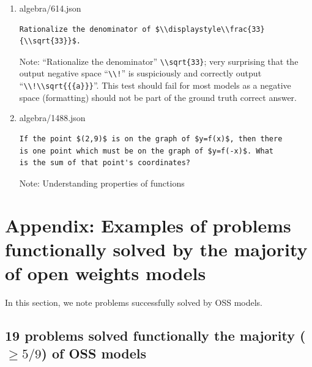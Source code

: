 \documentclass[11pt,a4paper]{article}
\begin{document}
\begin{enumerate}
  \item algebra/614.json
\begin{verbatim}
Rationalize the denominator of $\\displaystyle\\frac{33}{\\sqrt{33}}$.
\end{verbatim}
    Note: ``Rationalize the denominator'' \verb|\\sqrt{33}|; very surprising that the output negative space ``\verb|\\!|'' is suspiciously and correctly output ``\verb|\\!\\sqrt{{{a}}}|''. This test should fail for most models as a negative space (formatting) should not be part of the ground truth correct answer.

  \item algebra/1488.json
\begin{verbatim}
If the point $(2,9)$ is on the graph of $y=f(x)$, then there
is one point which must be on the graph of $y=f(-x)$. What
is the sum of that point's coordinates?
\end{verbatim}
    Note: Understanding properties of functions

\end{enumerate}

\section{Appendix: Examples of problems functionally solved by the majority of open weights models}
\label{appendix:oss-fn-solved-instances}
In this section, we note problems successfully solved by OSS models.

\subsection{19 problems solved functionally the majority ($\ge 5/9$) of OSS models}
\end{document}

